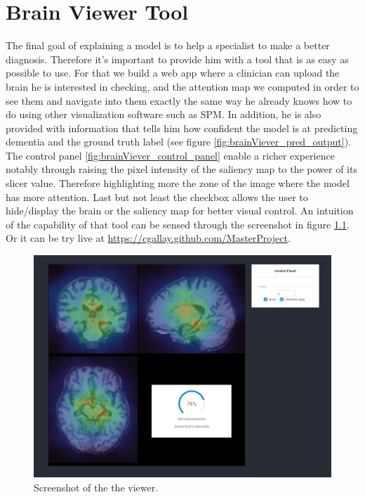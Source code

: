 \chapter{Brain Viewer Tool}
\label{chap:brainviewer}
The final goal of explaining a model is to help a specialist to make a better diagnosis. Therefore it's important to provide him with a tool that is as easy as possible to use. For that we build a web app where a clinician can upload the brain he is interested in checking, and the attention map we computed in order to see them and navigate into them exactly the same way he already knows how to do using other visualization software such as SPM\footnotemark{}. In addition, he is also provided with information that tells him how confident the model is at predicting dementia and the ground truth label (see figure \ref{fig:brainViever_pred_output}). The control panel \ref{fig:brainViever_control_panel} enable a richer experience notably through raising the pixel intensity of the saliency map to the power of its slicer value. Therefore highlighting more the zone of the image where the model has more attention. Last but not least the checkbox allows the user to hide/display the brain or the saliency map for better visual control. An intuition of the capability of that tool can be sensed through the screenshot in figure \ref{fig:brain_viewer}. Or it can be try live at \href{https://cgallay.github.com/MasterProject}{https://cgallay.github.com/MasterProject}.

\begin{figure}
 \centering
 \includegraphics[width=.9\linewidth]{figures/BrainViewer/main.png}
 \captionsetup{width=.9\linewidth}
 \caption{Screenshot of the the viewer.}
 \label{fig:brain_viewer}
\end{figure}

